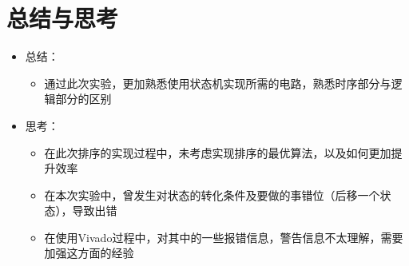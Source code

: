 \documentclass[UTF8,fontset=fandol]{ctexart}
\begin{document}
\section*{总结与思考}
\begin{itemize}
  \item 总结：
  \begin{itemize}
      \item 通过此次实验，更加熟悉使用状态机实现所需的电路，熟悉时序部分与逻辑部分的区别
  \end{itemize}
  \item 思考：
  \begin{itemize}
      \item 在此次排序的实现过程中，未考虑实现排序的最优算法，以及如何更加提升效率
      \item 在本次实验中，曾发生对状态的转化条件及要做的事错位（后移一个状态），导致出错
      \item 在使用Vivado过程中，对其中的一些报错信息，警告信息不太理解，需要加强这方面的经验
  \end{itemize}
\end{itemize}
\end{document}
